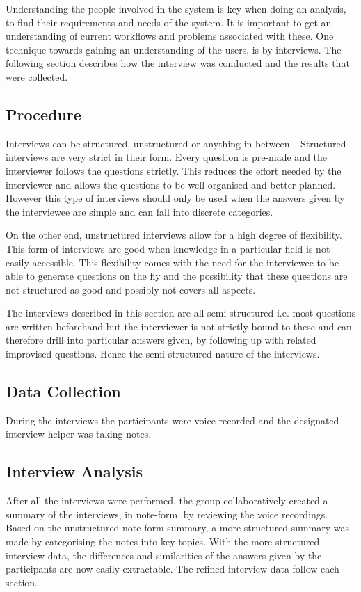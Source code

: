 \label{interviews}

Understanding the people involved in the system is key when doing an analysis, to find their requirements and needs of the system. It is important to get an understanding of current workflows and problems associated with these. One technique towards gaining an understanding of the users, is by interviews. The following section describes how the interview was conducted and the results that were collected.

\subsection{Procedure}
\label{sub:procedure}
Interviews can be structured, unstructured or anything in between~\cite{benyon2013designing}. Structured interviews are very strict in their form. Every question is pre-made and the interviewer follows the questions strictly. This reduces the effort needed by the interviewer and allows the questions to be well organised and better planned. However this type of interviews should only be used when the answers given by the interviewee are simple and can fall into discrete categories.

On the other end, unstructured interviews allow for a high degree of flexibility. This form of interviews are good when knowledge in a particular field is not easily accessible. This flexibility comes with the need for the interviewee to be able to generate questions on the fly and the possibility that these questions are not structured as good and possibly not covers all aspects.

The interviews described in this section are all semi-structured i.e. most questions are written beforehand but the interviewer is not strictly bound to these and can therefore drill into particular answers given, by following up with related improvised questions. Hence the semi-structured nature of the interviews.

\subsection{Data Collection}
\label{sub:data_collection}
During the interviews the participants were voice recorded and the designated interview helper was taking notes.

\subsection{Interview Analysis}
\label{sub:interview_analysis}
After all the interviews were performed, the group collaboratively created a summary of the interviews, in note-form, by reviewing the voice recordings. Based on the unstructured note-form summary, a more structured summary was made by categorising the notes into key topics. With the more structured interview data, the differences and similarities of the answers given by the participants are now easily extractable. The refined interview data follow each section.

